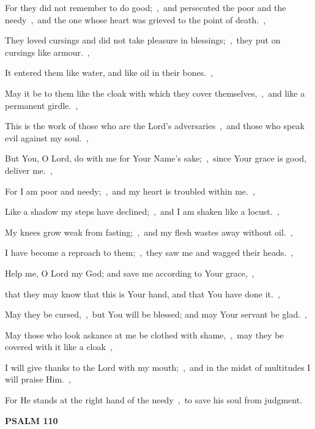 \documentclass[12pt,twoside,a5paper]{article}
\newcommand{\psalm}[1]{\textbf{PSALM {#1}}\nopagebreak}
\begin{document}
\begin{normalparskip}
  For they did not remember to do good;~\sep\ and persecuted the poor and the needy~\sep\ and the one whose heart was grieved to the point of death.~\sep

  They loved cursings and did not take pleasure in blessings;~\sep\ they put on cursings like armour.~\sep

  It entered them like water, and like oil in their bones.~\sep

  May it be to them like the cloak with which they cover themselves,~\sep\ and like a permanent girdle.~\sep

  This is the work of those who are the Lord's adversaries~\sep\ and those who speak evil against my soul.~\sep

  But You, O Lord, do with me for Your Name's sake;~\sep\ since Your grace is good, deliver me.~\sep

  For I am poor and needy;~\sep\ and my heart is troubled within me.~\sep

  Like a shadow my steps have declined;~\sep\ and I am shaken like a locust.~\sep

  My knees grow weak from fasting;~\sep\ and my flesh wastes away without oil.~\sep

  I have become a reproach to them;~\sep\ they saw me and wagged their heads.~\sep

  Help me, O Lord my God; and save me according to Your grace,~\sep

  that they may know that this is Your hand, and that You have done it.~\sep

  May they be cursed,~\sep\ but You will be blessed; and may Your servant be glad.~\sep

  May those who look askance at me be clothed with shame,~\sep\ may they be covered with it like a cloak~\sep

  I will give thanks to the Lord with my mouth;~\sep\ and in the midst of multitudes I will praise Him.~\sep

  For He stands at the right hand of the needy~\sep\ to save his soul from judgment.
\end{normalparskip}

\psalm{110}
\end{document}
